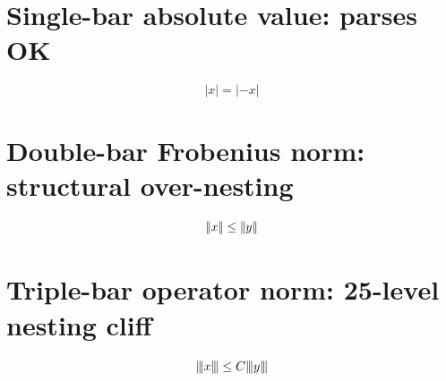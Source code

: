 \documentclass{article}
\newcommand{\verti}[1]{{\left\vert #1 \right\vert}}              %
\newcommand{\vertii}[1]{{\left\vert\kern-0.25ex\left\vert #1 \right\vert\kern-0.25ex\right\vert}}                                  %
\newcommand{\vertiii}[1]{{\left\vert\kern-0.25ex\left\vert\kern-0.25ex\left\vert #1 \right\vert\kern-0.25ex\right\vert\kern-0.25ex\right\vert}}  %
\newcommand{\vertif}[1]{{\left\vert\kern-0.25ex\left\vert #1 \right\vert\kern-0.25ex\right\vert}_F}                                %
\begin{document}
%
%
%

\section{Single-bar absolute value: parses OK}
\[ \verti{x} = \verti{-x} \]

\section{Double-bar Frobenius norm: structural over-nesting}
%
\[ \vertii{x} \leq \vertii{y} \]

\section{Triple-bar operator norm: 25-level nesting cliff}
%
\[ \vertiii{x} \leq C \vertiii{y} \]
\end{document}
